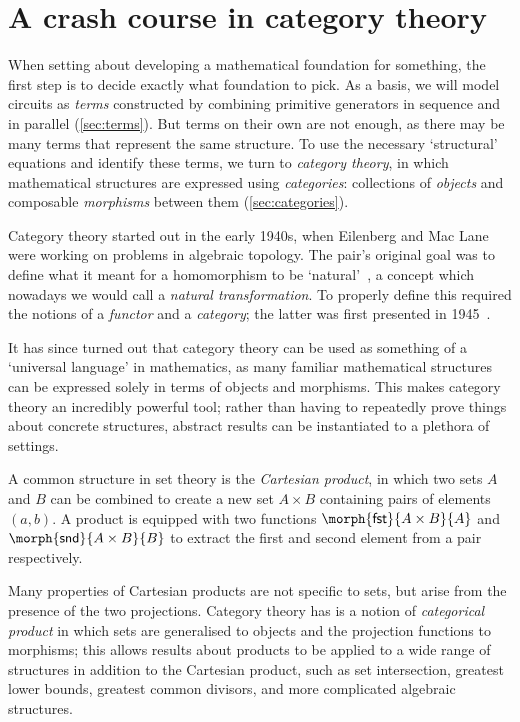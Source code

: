\chapter{A crash course in category theory}

When setting about developing a mathematical foundation for something,
the first step is to decide exactly what foundation to pick.
As a basis, we will model circuits as \emph{terms} constructed by combining
primitive generators in sequence and in parallel (\cref{sec:terms}).
But terms on their own are not enough, as there may be many terms that represent
the same structure.
To use the necessary `structural' equations and identify these terms, we turn
to \emph{category theory}, in which mathematical structures are expressed using
\emph{categories}: collections of \emph{objects} and composable \emph{morphisms}
between them (\cref{sec:categories}).

Category theory started out in the early 1940s, when Eilenberg and Mac Lane
were working on problems in algebraic topology.
The pair's original goal was to define what it meant for a homomorphism to be
`natural'~\cite{eilenberg1942natural}, a concept which nowadays we would call a
\emph{natural transformation}.
To properly define this required the notions of a \emph{functor}
and a \emph{category}; the latter was first presented in
1945~\cite{eilenberg1945general}.

It has since turned out that category theory can be used as something of a
`universal language' in mathematics, as many familiar mathematical structures
can be expressed solely in terms of objects and morphisms.
This makes category theory an incredibly powerful tool; rather than having to
repeatedly prove things about concrete structures, abstract results can be
instantiated to a plethora of settings.

\begin{example}
    A common structure in set theory is the \emph{Cartesian product}, in
    which two sets \(A\) and \(B\) can be combined to create a new set
    \(A \times B\) containing pairs of elements \((a,b)\).
    A product is equipped with two functions
    \(\morph{\mathsf{fst}}{A \times B}{A}\) and
    \(\morph{\mathsf{snd}}{A \times B}{B}\) to extract the first and second
    element from a pair respectively.

    Many properties of Cartesian products are not specific to sets,
    but arise from the presence of the two projections.
    Category theory has is a notion of \emph{categorical product} in which
    sets are generalised to objects and the projection functions to morphisms;
    this allows results about products to be applied to a wide range of
    structures in addition to the Cartesian product, such as set intersection,
    greatest lower bounds, greatest common divisors, and more complicated
    algebraic structures.
\end{example}

